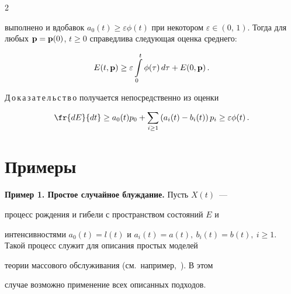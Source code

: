 \begin{multicols}{2}
{выполнено и вдобавок $a_0(t) \ge \varepsilon \phi


(t)$ при некотором $\varepsilon \in (0,\,1)$. Тогда для любых ${\bf


p}= {\bf p}(0)$, $t \ge 0$  справедлива следующая оценка среднего:


\begin{equation}


 E(t,{\bf p}) \ge


 \varepsilon \int\limits_0^t   \phi (\tau)\,


d\tau  +  E(0,{\bf p})\,. 


\label{30008}


\end{equation}





}





Д\,о\,к\,а\,з\,а\,т\,е\,л\,ь\,с\,т\,в\,о получается непосредственно из оценки


\begin{equation*}


\fr{dE}{dt} \ge a_0(t)p_0 + \sum\limits_{i \ge 1} \left(a_i(t) - b_i(t)\right)


p_i \ge  \varepsilon \phi (t)\,. 




\end{equation*}





\section{Примеры}





\noindent


{\bf Пример 1. Простое случайное блуждание.} Пусть $X(t)$~---


процесс рождения и гибели с пространством состояний $E$ и


интенсивностями $a_{0}(t) =l(t)$ и $a_{i}(t)= a(t),\ b_{i}(t)=


b(t),\ i\geq 1$. Такой процесс служит для описания простых моделей


теории массового обслуживания (см.\ например,~\cite{t}). В этом


случае возможно применение всех описанных подходов.






\end{multicols}
